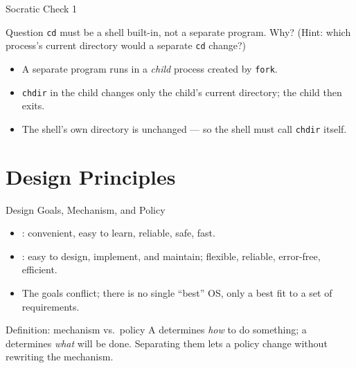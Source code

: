 \documentclass[aspectratio=169]{beamer}
\begin{document}
\begin{frame}{Socratic Check 1}
  \begin{block}{Question}
    \texttt{cd} must be a shell built-in, not a separate program. Why? (Hint:
    which process's current directory would a separate \texttt{cd} change?)
  \end{block}
  \vspace{0.25cm}
  \begin{itemize}
    \item A separate program runs in a \emph{child} process created by
      \texttt{fork}.
    \item \texttt{chdir} in the child changes only the child's current
      directory; the child then exits.
    \item The shell's own directory is unchanged --- so the shell must call
      \texttt{chdir} itself.
  \end{itemize}
\end{frame}


\section{Design Principles}

\begin{frame}{Design Goals, Mechanism, and Policy}
  \begin{itemize}
    \item {}: convenient, easy to learn, reliable, safe, fast.
    \item {}: easy to design, implement, and maintain;
      flexible, reliable, error-free, efficient.
    \item The goals conflict; there is no single ``best'' OS, only a best fit
      to a set of requirements.
  \end{itemize}
  \vspace{0.15cm}
  \begin{block}{Definition: mechanism vs.\ policy}
    A  determines \emph{how} to do something; a 
    determines \emph{what} will be done. Separating them lets a policy change
    without rewriting the mechanism.
  \end{block}
\end{frame}
\end{document}

